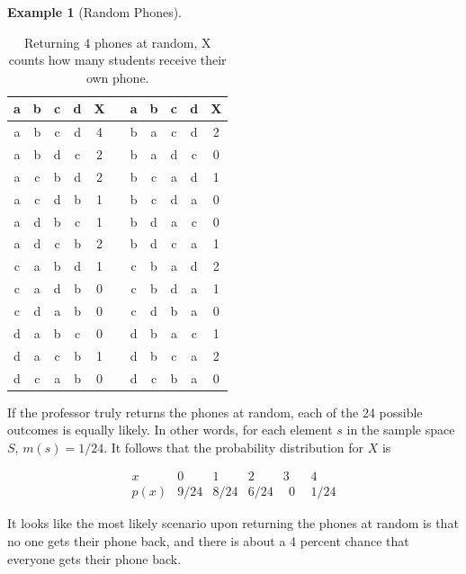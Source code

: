 \documentclass[
]{book}
\theoremstyle{definition}
\theoremstyle{definition}
\newtheorem{example}{Example}[chapter]
\theoremstyle{definition}
\theoremstyle{definition}
\theoremstyle{remark}
\begin{document}
\begin{example}[Random Phones]
\begin{table}
\centering
\caption{\label{tab:unnamed-chunk-6}Returning 4 phones at random, X counts how many students receive their own phone.}
\centering
\begin{tabular}[t]{|>{}c|c|c|>{}c||>{}c||>{}c||c|c|c|>{}c||>{}c|}
\hline
\textbf{a} & \textbf{b} & \textbf{c} & \textbf{d} & \textbf{X} & \textbf{ } & \textbf{a} & \textbf{b} & \textbf{c} & \textbf{d} & \textbf{X}\\
\hline
a & b & c & d & 4 &  & b & a & c & d & 2\\
\hline
a & b & d & c & 2 &  & b & a & d & c & 0\\
\hline
a & c & b & d & 2 &  & b & c & a & d & 1\\
\hline
a & c & d & b & 1 &  & b & c & d & a & 0\\
\hline
a & d & b & c & 1 &  & b & d & a & c & 0\\
\hline
a & d & c & b & 2 &  & b & d & c & a & 1\\
\hline
c & a & b & d & 1 &  & c & b & a & d & 2\\
\hline
c & a & d & b & 0 &  & c & b & d & a & 1\\
\hline
c & d & a & b & 0 &  & c & d & b & a & 0\\
\hline
d & a & b & c & 0 &  & d & b & a & c & 1\\
\hline
d & a & c & b & 1 &  & d & b & c & a & 2\\
\hline
d & c & a & b & 0 &  & d & c & b & a & 0\\
\hline
\end{tabular}
\end{table}

If the professor truly returns the phones at random, each of the 24 possible outcomes is equally likely. In other words, for each element \(s\) in the sample space \(S\), \(m(s) = 1/24\). It follows that the probability distribution for \(X\) is

\[
\begin{array}{c|c|c|c|c|c}
x & 0 & 1 & 2 & 3 & 4\\ \hline
p(x) & 9/24 & 8/24 & 6/24 & ~~0~~ & 1/24  
\end{array}
\]

It looks like the most likely scenario upon returning the phones at random is that no one gets their phone back, and there is about a 4 percent chance that everyone gets their phone back.

\end{example}
\end{document}
